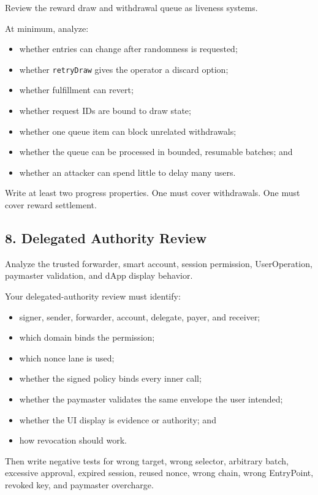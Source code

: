 Review the reward draw and withdrawal queue as liveness systems.

At minimum, analyze:

\begin{itemize}
\item whether entries can change after randomness is requested;
\item whether \texttt{retryDraw} gives the operator a discard option;
\item whether fulfillment can revert;
\item whether request IDs are bound to draw state;
\item whether one queue item can block unrelated withdrawals;
\item whether the queue can be processed in bounded, resumable batches; and
\item whether an attacker can spend little to delay many users.
\end{itemize}

Write at least two progress properties. One must cover withdrawals. One must cover reward settlement.

\subsection*{8. Delegated Authority Review}

Analyze the trusted forwarder, smart account, session permission, UserOperation, paymaster validation, and dApp display behavior.

Your delegated-authority review must identify:

\begin{itemize}
\item signer, sender, forwarder, account, delegate, payer, and receiver;
\item which domain binds the permission;
\item which nonce lane is used;
\item whether the signed policy binds every inner call;
\item whether the paymaster validates the same envelope the user intended;
\item whether the UI display is evidence or authority; and
\item how revocation should work.
\end{itemize}

Then write negative tests for wrong target, wrong selector, arbitrary batch, excessive approval, expired session, reused nonce, wrong chain, wrong EntryPoint, revoked key, and paymaster overcharge.

